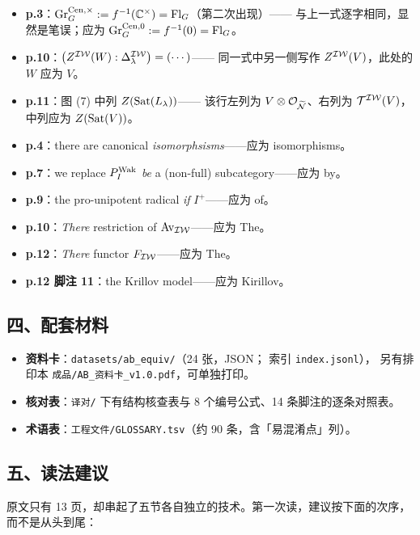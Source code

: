 \begin{itemize}[leftmargin=2.2em,itemsep=3pt]
\item \textbf{p.3}：$\mathrm{Gr}_G^{\mathrm{Cen},\times}:=f^{-1}(\mathbb{C}^\times)=\mathrm{Fl}_G$（第二次出现）——
      与上一式逐字相同，显然是笔误；应为 $\mathrm{Gr}_G^{\mathrm{Cen},0}:=f^{-1}(0)=\mathrm{Fl}_G$。
\item \textbf{p.10}：$\bigl(Z^{\mathcal{IW}}(W):\Delta^{\mathcal{IW}}_\lambda\bigr)=(\cdots)$——
      同一式中另一侧写作 $Z^{\mathcal{IW}}(V)$，此处的 $W$ 应为 $V$。
\item \textbf{p.11}：图 (7) 中列 $Z(\mathrm{Sat}(L_\lambda))$——
      该行左列为 $V\otimes\mathcal{O}_{\widetilde{\mathcal{N}}}$、右列为 $\mathcal{T}^{\mathcal{IW}}(V)$，中列应为 $Z(\mathrm{Sat}(V))$。
\item \textbf{p.4}：there are canonical \emph{isomorphsisms}——应为 isomorphisms。
\item \textbf{p.7}：we replace $P_I^{\mathrm{Wak}}$ \emph{be} a (non-full) subcategory——应为 by。
\item \textbf{p.9}：the pro-unipotent radical \emph{if} $I^+$——应为 of。
\item \textbf{p.10}：\emph{There} restriction of $\mathrm{Av}_{\mathcal{IW}}$——应为 The。
\item \textbf{p.12}：\emph{There} functor $F_{\mathcal{IW}}$——应为 The。
\item \textbf{p.12 脚注 11}：the Krillov model——应为 Kirillov。
\end{itemize}

\subsection*{四、配套材料}

\begin{itemize}[leftmargin=2.2em,itemsep=2pt]
\item \textbf{资料卡}：\texttt{datasets/ab\_equiv/}（24 张，JSON；
     索引 \texttt{index.jsonl}），
     另有排印本 \texttt{成品/AB\_资料卡\_v1.0.pdf}，可单独打印。
\item \textbf{核对表}：\texttt{译对/} 下有结构核查表与 8 个编号公式、14 条脚注的逐条对照表。
\item \textbf{术语表}：\texttt{工程文件/GLOSSARY.tsv}（约 90 条，含「易混淆点」列）。
\end{itemize}

\subsection*{五、读法建议}

原文只有 13 页，却串起了五节各自独立的技术。第一次读，建议按下面的次序，而不是从头到尾：

